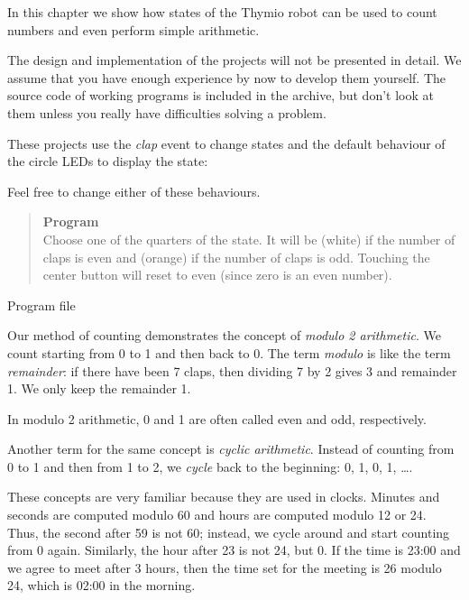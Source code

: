 
\label{ch.counting}

In this chapter we show how states of the Thymio robot can be used to
count numbers and even perform simple arithmetic.

The design and implementation of the projects will not be presented
in detail. We assume that you have enough experience by now to develop
them yourself. The source code of working programs is included in the
archive, but don't look at them unless you really have difficulties
solving a problem.

These projects use the \emph{clap} event to change states and
the default behaviour of the circle LEDs to display the state:


Feel free to change either of these behaviours.


\begin{quote}
\textbf{Program}\\Choose one of the quarters of the state.
It will be  (white) if the number of claps
is even and  (orange) if the number of claps is odd.
Touching the center button will reset to even
(since zero is an even number).
\end{quote}

{\raggedleft \hfill Program file }

Our method of counting demonstrates the concept of
\emph{modulo 2 arithmetic}.
We count starting from 0 to 1 and then back to 0.
The term \emph{modulo} is like the term \emph{remainder}:
if there have been 7 claps, then dividing 7 by 2 gives 3 and
remainder 1.
We only keep the remainder 1.

In modulo 2 arithmetic, 0 and 1 are often called even and odd,
respectively.

Another term for the same concept is \emph{cyclic arithmetic}.
Instead of counting from 0 to 1 and then from 1 to 2,
we \emph{cycle} back to the beginning:
0, 1, 0, 1, \ldots.

These concepts are very familiar because they are used in clocks.
Minutes and seconds are computed modulo 60 and hours are computed modulo
12 or 24. Thus, the second after 59 is not 60; instead, we cycle around
and start counting from 0 again. Similarly, the hour after 23 is not 24,
but 0. If the time is 23:00 and we agree to meet after 3 hours,
then the time set for the meeting is 26 modulo 24, which is 02:00 in the
morning.

